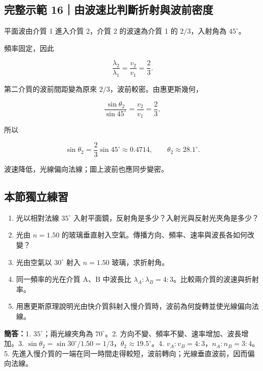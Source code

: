 \documentclass[11pt,a4paper]{article}
\providecommand{\tightlist}{%
  \setlength{\itemsep}{0pt}\setlength{\parskip}{0pt}}
\begin{document}
\begin{HandoutWorkedExample}

\subsection{完整示範 16｜由波速比判斷折射與波前密度}\label{ux5b8cux6574ux793aux7bc4-16ux7531ux6ce2ux901fux6bd4ux5224ux65b7ux6298ux5c04ux8207ux6ce2ux524dux5bc6ux5ea6}

平面波由介質 1 進入介質 2，介質 2 的波速為介質 1 的 \(2/3\)，入射角為 \(45^\circ\)。

頻率固定，因此

\[
\frac{\lambda_2}{\lambda_1}
=\frac{v_2}{v_1}
=\frac23.
\]

第二介質的波前間距變為原來 \(2/3\)，波前較密。由惠更斯幾何，

\[
\frac{\sin\theta_2}{\sin45^\circ}
=\frac{v_2}{v_1}
=\frac23,
\]

所以

\[
\sin\theta_2=\frac23\sin45^\circ\approx0.4714,
\qquad
\theta_2\approx28.1^\circ.
\]

波速降低，光線偏向法線；圖上波前也應同步變密。

\end{HandoutWorkedExample}

\begin{HandoutSelfCheck}

\subsection{本節獨立練習}\label{ux672cux7bc0ux7368ux7acbux7df4ux7fd2-4}

\begin{enumerate}
\def\labelenumi{\arabic{enumi}.}
\tightlist
\item
  光以相對法線 \(35^\circ\) 入射平面鏡，反射角是多少？入射光與反射光夾角是多少？
\item
  光由 \(n=1.50\) 的玻璃垂直射入空氣。傳播方向、頻率、速率與波長各如何改變？
\item
  光由空氣以 \(30^\circ\) 射入 \(n=1.50\) 玻璃，求折射角。
\item
  同一頻率的光在介質 A、B 中波長比 \(\lambda_A:\lambda_B=4:3\)。比較兩介質的波速與折射率。
\item
  用惠更斯原理說明光由快介質斜射入慢介質時，波前為何旋轉並使光線偏向法線。
\end{enumerate}

\textbf{簡答：}1. \(35^\circ\)；兩光線夾角為 \(70^\circ\)。2. 方向不變、頻率不變、速率增加、波長增加。3. \(\sin\theta_2=\sin30^\circ/1.50=1/3\)，\(\theta_2\approx19.5^\circ\)。4. \(v_A:v_B=4:3\)，\(n_A:n_B=3:4\)。5. 先進入慢介質的一端在同一時間走得較短，波前轉向；光線垂直波前，因而偏向法線。

\end{HandoutSelfCheck}
\end{document}
